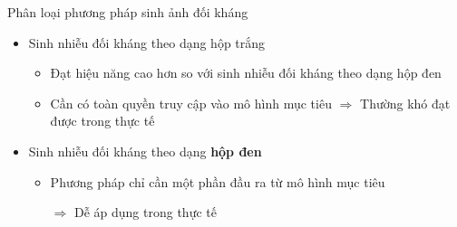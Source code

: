 \documentclass[aspectratio=169, 12pt]{beamer}
\begin{document}
\begin{frame}{Phân loại phương pháp sinh ảnh đối kháng}

\begin{itemize}

    \item Sinh nhiễu đối kháng theo dạng hộp trắng
    
\begin{itemize}

        \item Đạt hiệu năng cao hơn so với sinh nhiễu đối kháng theo dạng hộp đen

        \item Cần có toàn quyền truy cập vào mô hình mục tiêu
        $\Rightarrow$ Thường khó đạt được trong thực tế
    
\end{itemize}

    \item Sinh nhiễu đối kháng theo dạng \textbf{hộp đen}
\begin{itemize}
    \item Phương pháp chỉ cần một phần đầu ra từ mô hình mục tiêu
    
    $\Rightarrow$ Dễ áp dụng trong thực tế
\end{itemize}

\end{itemize}

\end{frame}
\end{document}
